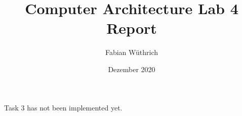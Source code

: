 \documentclass[a4paper]{article}
\begin{document}
\title{Computer Architecture Lab 4 Report}
\author{Fabian Wüthrich}
\date{Dezember 2020}
\maketitle

Task 3 has not been implemented yet.
\end{document}
